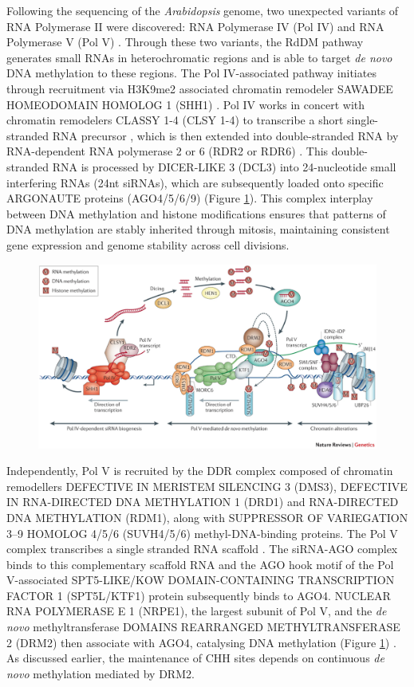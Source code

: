 Following the sequencing of the \textit{Arabidopsis} genome, two unexpected variants of RNA Polymerase II were discovered: RNA Polymerase IV (Pol IV) and RNA Polymerase V (Pol V) \citep{RN115}. Through these two variants, the RdDM pathway generates small RNAs in heterochromatic regions and is able to target \textit{de novo} DNA methylation to these regions. The Pol IV-associated pathway initiates through recruitment via H3K9me2 associated chromatin remodeler SAWADEE HOMEODOMAIN HOMOLOG 1 (SHH1) \citep{RN206,RN98,RN99,RN116}.  Pol IV works in concert with chromatin remodelers CLASSY 1-4 (CLSY 1-4) to transcribe a short single-stranded RNA precursor \citep{RN117}, which is then extended into double-stranded RNA by RNA-dependent RNA polymerase 2 or 6 (RDR2 or RDR6) \citep{RN61,RN33}. This double-stranded RNA is processed by DICER-LIKE 3 (DCL3) into 24-nucleotide small interfering RNAs (24nt siRNAs), which are subsequently loaded onto specific ARGONAUTE proteins (AGO4/5/6/9) \citep{RN33}(Figure \ref{fig:RdDM_overview}). This complex interplay between DNA methylation and histone modifications ensures that patterns of DNA methylation are stably inherited through mitosis, maintaining consistent gene expression and genome stability across cell divisions.

\begin{figure}[htbp!] 
\centering    
    \includegraphics[width=1\textwidth]{Chapter1/Figs/RdDM.png}
\caption{}
\label{fig:RdDM_overview}
\captionsetup{font=small}
    \caption*{}
\end{figure}

Independently, Pol V is recruited by the DDR complex composed of chromatin remodellers DEFECTIVE IN MERISTEM SILENCING 3 (DMS3), DEFECTIVE IN RNA-DIRECTED DNA METHYLATION 1 (DRD1) and RNA-DIRECTED DNA METHYLATION (RDM1), along with SUPPRESSOR OF VARIEGATION 3–9 HOMOLOG 4/5/6 (SUVH4/5/6) methyl-DNA-binding proteins. The Pol V complex transcribes a single stranded RNA scaffold \citep{RN33}. The siRNA-AGO complex binds to this complementary scaffold RNA and the AGO hook motif of the Pol V-associated SPT5-LIKE/KOW DOMAIN-CONTAINING TRANSCRIPTION FACTOR 1 (SPT5L/KTF1) protein subsequently binds to AGO4. NUCLEAR RNA POLYMERASE E 1 (NRPE1), the largest subunit of Pol V, and the \textit{de novo} methyltransferase DOMAINS REARRANGED METHYLTRANSFERASE 2 (DRM2) then associate with AGO4, catalysing DNA methylation (Figure \ref{fig:RdDM_overview})  \citep{RN228,RN121,RN122}. As discussed earlier, the maintenance of CHH sites depends on continuous \textit{de novo} methylation mediated by DRM2.

